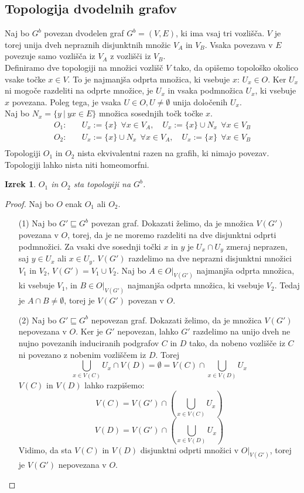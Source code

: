 \documentclass[mat1, tisk]{fmfdelo}
\newtheorem{theorem}{Izrek}[subsection]
\begin{document}
\subsection{Topologija dvodelnih grafov}
Naj bo $G^b$ povezan dvodelen graf $G^b = (V,E)$, ki ima vsaj tri vozlišča.
$V$ je torej unija dveh nepraznih disjunktnih množic $V_A$ in $V_B$. Vsaka
povezava v $E$ povezuje samo vozlišča iz $V_A$ z vozlišči iz $V_B$.\\
Definiramo dve topologiji na množici vozlišč $V$ tako, da opišemo
topološko okolico vsake točke $x \in V$. To je najmanjša odprta množica, ki
vsebuje $x$: $U_x \in O$. Ker $U_x$ ni mogoče razdeliti na odprte množice, je $U_x$
in vsaka podmnožica $U_x$, ki vsebuje $x$ povezana.
Poleg tega, je vsaka $U \in O, U \neq \emptyset$ unija določenih $U_x$.\\
Naj bo $N_x = \{y \  | \  yx \in E\}$ množica sosednjih točk točke $x$.\\
\[
  \begin{split}
  O_1:&\quad
  U_x:=\{x\}\ \ \forall x \in V_A, \quad
  U_x:=\{x\}\cup N_x\ \  \forall x \in V_B\\
  O_2:&\quad
  U_x:=\{x\}\cup N_x\ \  \forall x \in V_A, \quad
  U_x:=\{x\}\ \ \forall x \in V_B\\
\end{split}
\]
Topologiji $O_1$ in $O_2$ nista ekvivalentni razen na grafih, ki nimajo povezav.
Topologiji lahko nista niti homeomorfni.
\begin{theorem}
  $O_1$ in $O_2$ sta topologiji na $G^b$.
\end{theorem}
\begin{proof}
  Naj bo $O$ enak $O_1$ ali $O_2$.
  \begin{itemize}
    \item[(1)] Naj bo $G' \sqsubseteq G^b$ povezan graf. Dokazati želimo, da je
    množica $V(G')$ povezana v $O$, torej, da je ne moremo razdeliti na dve
    disjunktni odprti podmnožici. Za vsaki dve sosednji točki $x$ in $y$ je
    $U_x \cap U_y$ zmeraj neprazen, saj $y \in U_x$ ali $x \in U_y$. $V(G')$
    razdelimo na dve neprazni disjunktni množici $V_1$ in $V_2$,
    $V(G') = V_1 \cup V_2$. Naj bo $A \in O|_{V(G')}$
    najmanjša odprta množica, ki vsebuje $V_1$, in $B \in O|_{V(G')}$
    najmanjša odprta množica, ki vsebuje $V_2$. Tedaj je $A \cap B \neq \emptyset$,
    torej je $V(G')$ povezan v $O$.
    \item[(2)] Naj bo $G' \sqsubseteq G^b$ nepovezan graf. Dokazati želimo, da
    je množica $V(G')$ nepovezana v $O$. Ker je $G'$ nepovezan, lahko $G'$ razdelimo
    na unijo dveh ne nujno povezanih induciranih podgrafov $C$ in $D$ tako, da nobeno vozlišče iz $C$
    ni povezano z nobenim vozliščem iz $D$. Torej
    \[\bigcup_{x\in V(C)}U_x \cap V(D) = \emptyset = V(C) \cap \bigcup_{x\in V(D)}U_x\]
    $V(C)$ in $V(D)$ lahko razpišemo:
    \[V(C) = V(G') \cap \left(\bigcup_{x\in V(C)} U_x\right)\]
    \[V(D) = V(G') \cap \left(\bigcup_{x\in V(D)} U_x\right)\]
    Vidimo, da sta $V(C)$ in $V(D)$ disjunktni odprti množici v $O|_{V(G')}$,
    torej je $V(G')$ nepovezana v $O$.
  \end{itemize}
\end{proof}
\end{document}
